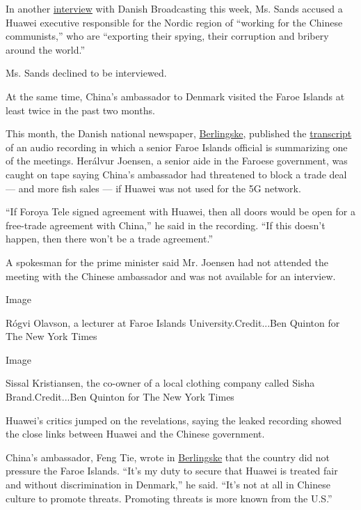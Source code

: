 In another
\href{https://www.dr.dk/nyheder/penge/usa-ambassadoer-i-danmark-angriber-huawei-direktoer-han-arbejder-de-kinesiske}{interview}
with Danish Broadcasting this week, Ms. Sands accused a Huawei executive
responsible for the Nordic region of ``working for the Chinese
communists,'' who are ``exporting their spying, their corruption and
bribery around the world.''

Ms. Sands declined to be interviewed.

At the same time, China's ambassador to Denmark visited the Faroe
Islands at least twice in the past two months.

This month, the Danish national newspaper,
\href{https://www.berlingske.dk/internationalt/banned-recording-reveals-china-ambassador-threatened-faroese-leader}{Berlingske},
published the
\href{https://www.berlingske.dk/globalt/documentation-read-the-printout-of-the-banned-recording}{transcript}
of an audio recording in which a senior Faroe Islands official is
summarizing one of the meetings. Herálvur Joensen, a senior aide in the
Faroese government, was caught on tape saying China's ambassador had
threatened to block a trade deal --- and more fish sales --- if Huawei
was not used for the 5G network.

``If Foroya Tele signed agreement with Huawei, then all doors would be
open for a free-trade agreement with China,'' he said in the recording.
``If this doesn't happen, then there won't be a trade agreement.''

A spokesman for the prime minister said Mr. Joensen had not attended the
meeting with the Chinese ambassador and was not available for an
interview.

Image

Rógvi Olavson, a lecturer at Faroe Islands University.Credit...Ben
Quinton for The New York Times

Image

Sissal Kristiansen, the co-owner of a local clothing company called
Sisha Brand.Credit...Ben Quinton for The New York Times

Huawei's critics jumped on the revelations, saying the leaked recording
showed the close links between Huawei and the Chinese government.

China's ambassador, Feng Tie, wrote in
\href{https://www.berlingske.dk/kommentatorer/kinesisk-ambassadoer-i-danmark-usa-er-den-stoerste-usikkerhedsfaktor}{Berlingske}
that the country did not pressure the Faroe Islands. ``It's my duty to
secure that Huawei is treated fair and without discrimination in
Denmark,'' he said. ``It's not at all in Chinese culture to promote
threats. Promoting threats is more known from the U.S.''

